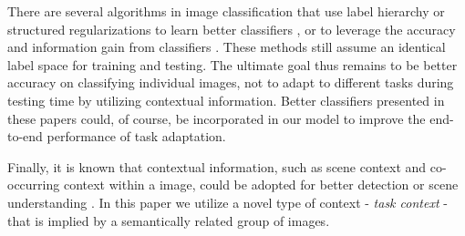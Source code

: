 There are several algorithms in image classification that use label hierarchy or structured regularizations to learn better classifiers \cite{salakhutdinov2011learning,harchaoui2012large,gao2011discriminative}, or to leverage the accuracy and information gain from classifiers \cite{deng2012hedging}. These methods still assume an identical label space for training and testing. The ultimate goal thus remains to be better accuracy on classifying individual images, not to adapt to different tasks during testing time by utilizing contextual information. Better classifiers presented in these papers could, of course, be incorporated in our model to improve the end-to-end performance of task adaptation.

Finally, it is known that contextual information, such as scene context and co-occurring context within a image, could be adopted for better detection \cite{torralba2003contextual} or scene understanding \cite{li2009towards}. In this paper we utilize a novel type of context - \emph{task context} - that is implied by a semantically related group of images.


